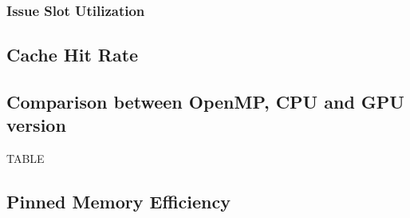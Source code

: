 \subsubsection{Issue Slot Utilization}

\subsection{Cache Hit Rate}

\subsection{Comparison between OpenMP, CPU and GPU version}

TABLE

\subsection{Pinned Memory Efficiency}



